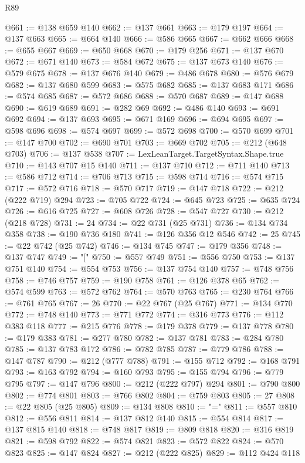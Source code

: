 \begin{lexlean}{R89}
\begin{coremodule}
@661 := @138 @659 @140
@662 := @137 @661
@663 := @179 @197
@664 := @137 @663
@665 := @664 @140
@666 := @586 @665
@667 := @662 @666
@668 := @655 @667
@669 := @650 @668
@670 := @179 @256
@671 := @137 @670
@672 := @671 @140
@673 := @584 @672
@675 := @137 @673 @140
@676 := @579 @675
@678 := @137 @676 @140
@679 := @486 @678
@680 := @576 @679
@682 := @137 @680 @599
@683 := @575 @682
@685 := @137 @683 @171
@686 := @574 @685
@687 := @572 @686
@688 := @570 @687
@689 := @147 @688
@690 := @619 @689
@691 := @282 @69
@692 := @486 @140
@693 := @691 @692
@694 := @137 @693
@695 := @671 @169
@696 := @694 @695
@697 := @598 @696
@698 := @574 @697
@699 := @572 @698
@700 := @570 @699
@701 := @147 @700
@702 := @690 @701
@703 := @669 @702
@705 := @212 (@648 @703)
@706 := @137 @538
@707 := LexLeanTarget.TargetSyntax.Shape.true
@710 := @143 @707 @15 @140
@711 := @137 @710
@712 := @711 @140
@713 := @586 @712
@714 := @706 @713
@715 := @598 @714
@716 := @574 @715
@717 := @572 @716
@718 := @570 @717
@719 := @147 @718
@722 := @212 (@222 @719) @294
@723 := @705 @722
@724 := @645 @723
@725 := @635 @724
@726 := @616 @725
@727 := @608 @726
@728 := @547 @727
@730 := @212 (@218 @728)
@731 := 24
@734 := @22 @731 (@25 @731)
@736 := @134 @734 @358
@738 := @190 @736 @180
@741 := @126 @356 @12 @546
@742 := 25
@745 := @22 @742 (@25 @742)
@746 := @134 @745
@747 := @179 @356
@748 := @137 @747
@749 := "["
@750 := @557 @749
@751 := @556 @750
@753 := @137 @751 @140
@754 := @554 @753
@756 := @137 @754 @140
@757 := @748 @756
@758 := @746 @757
@759 := @190 @758
@761 := @126 @378 @65
@762 := @574 @599
@763 := @572 @762
@764 := @570 @763
@765 := @230 @764
@766 := @761 @765
@767 := 26
@770 := @22 @767 (@25 @767)
@771 := @134 @770
@772 := @748 @140
@773 := @771 @772
@774 := @316 @773
@776 := @112 @383 @118
@777 := @215 @776
@778 := @179 @378
@779 := @137 @778
@780 := @179 @383
@781 := @277 @780
@782 := @137 @781
@783 := @284 @780
@785 := @137 @783 @172
@786 := @782 @785
@787 := @779 @786
@788 := @147 @787
@790 := @212 (@777 @788)
@791 := @155 @712
@792 := @168 @791
@793 := @163 @792
@794 := @160 @793
@795 := @155 @794
@796 := @779 @795
@797 := @147 @796
@800 := @212 (@222 @797) @294
@801 := @790 @800
@802 := @774 @801
@803 := @766 @802
@804 := @759 @803
@805 := 27
@808 := @22 @805 (@25 @805)
@809 := @134 @808
@810 := "="
@811 := @557 @810
@812 := @556 @811
@814 := @137 @812 @140
@815 := @554 @814
@817 := @137 @815 @140
@818 := @748 @817
@819 := @809 @818
@820 := @316 @819
@821 := @598 @792
@822 := @574 @821
@823 := @572 @822
@824 := @570 @823
@825 := @147 @824
@827 := @212 (@222 @825)
@829 := @112 @424 @118

\end{coremodule}
\end{lexlean}
